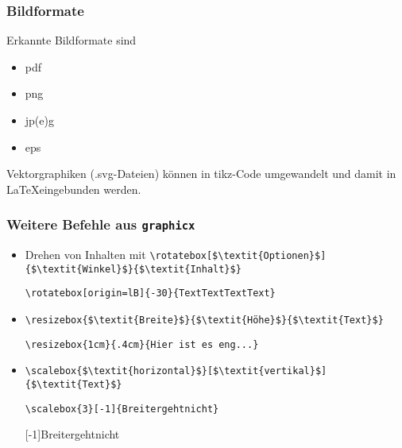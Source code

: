 \begin{frame}[fragile]
  \frametitle{Bildformate}
  Erkannte Bildformate sind
  \begin{itemize}
    \item pdf
    \item png
    \item jp(e)g
    \item eps
  \end{itemize}
  Vektorgraphiken (.svg-Dateien) können in tikz-Code umgewandelt und damit in \LaTeX eingebunden werden.
  
\end{frame}
\begin{frame}[fragile]
  \frametitle{Weitere Befehle aus \texttt{graphicx}}

  \onslide<+->

  \begin{itemize}[<+->]
  \item Drehen von Inhalten mit
    \lstinline!\rotatebox[$\textit{Optionen}$]{$\textit{Winkel}$}{$\textit{Inhalt}$}!
    \onslide<+->
\begin{lstlisting}
\rotatebox[origin=lB]{-30}{TextTextTextText}
\end{lstlisting}
  \item \lstinline!\resizebox{$\textit{Breite}$}{$\textit{Höhe}$}{$\textit{Text}$}!
    \onslide<+->
\begin{lstlisting}
\resizebox{1cm}{.4cm}{Hier ist es eng...}
\end{lstlisting}
  \item \lstinline!\scalebox{$\textit{horizontal}$}[$\textit{vertikal}$]{$\textit{Text}$}!
    \onslide<+->
\begin{lstlisting}
\scalebox{3}[-1]{Breitergehtnicht}
\end{lstlisting}
    \scalebox{3}[-1]{Breitergehtnicht}
  \end{itemize}
\end{frame}

